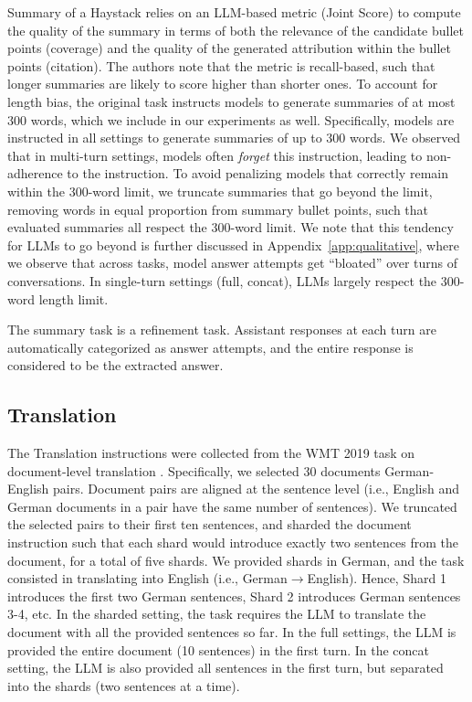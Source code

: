 \documentclass{article}
\begin{document}
\begin{appendices}
Summary of a Haystack relies on an LLM-based metric (Joint Score) to compute the quality of the summary in terms of both the relevance of the candidate bullet points (coverage) and the quality of the generated attribution within the bullet points (citation). The authors note that the metric is recall-based, such that longer summaries are likely to score higher than shorter ones. To account for length bias, the original task instructs models to generate summaries of at most 300 words, which we include in our experiments as well. Specifically, models are instructed in all settings to generate summaries of up to 300 words. We observed that in multi-turn settings, models often \textit{forget} this instruction, leading to non-adherence to the instruction. To avoid penalizing models that correctly remain within the 300-word limit, we truncate summaries that go beyond the limit, removing words in equal proportion from summary bullet points, such that evaluated summaries all respect the 300-word limit. We note that this tendency for LLMs to go beyond is further discussed in Appendix~\ref{app:qualitative}, where we observe that across tasks, model answer attempts get ``bloated'' over turns of conversations. In single-turn settings (full, concat), LLMs largely respect the 300-word length limit.

The summary task is a refinement task. Assistant responses at each turn are automatically categorized as answer attempts, and the entire response is considered to be the extracted answer.

\subsection{\texorpdfstring{\translation Translation}{Translation}}

The Translation instructions were collected from the WMT 2019 task on document-level translation \cite{scherrer2019wmt}. Specifically, we selected 30 documents German-English pairs. Document pairs are aligned at the sentence level (i.e., English and German documents in a pair have the same number of sentences). We truncated the selected pairs to their first ten sentences, and sharded the document instruction such that each shard would introduce exactly two sentences from the document, for a total of five shards. We provided shards in German, and the task consisted in translating into English (i.e., German$\to$English). Hence, Shard 1 introduces the first two German sentences, Shard 2 introduces German sentences 3-4, etc. In the sharded setting, the task requires the LLM to translate the document with all the provided sentences so far. In the full settings, the LLM is provided the entire document (10 sentences) in the first turn. In the concat setting, the LLM is also provided all sentences in the first turn, but separated into the shards (two sentences at a time).


\end{appendices}
\end{document}
